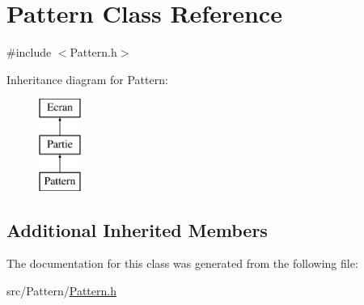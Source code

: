 \hypertarget{class_pattern}{}\section{Pattern Class Reference}
\label{class_pattern}


{\ttfamily \#include $<$Pattern.\+h$>$}

Inheritance diagram for Pattern\+:\begin{figure}[H]
\begin{center}
\leavevmode
\includegraphics[height=3.000000cm]{class_pattern}
\end{center}
\end{figure}
\subsection*{Additional Inherited Members}


The documentation for this class was generated from the following file\+:\begin{DoxyCompactItemize}
\item 
src/\+Pattern/\mbox{\hyperlink{_pattern_8h}{Pattern.\+h}}\end{DoxyCompactItemize}
